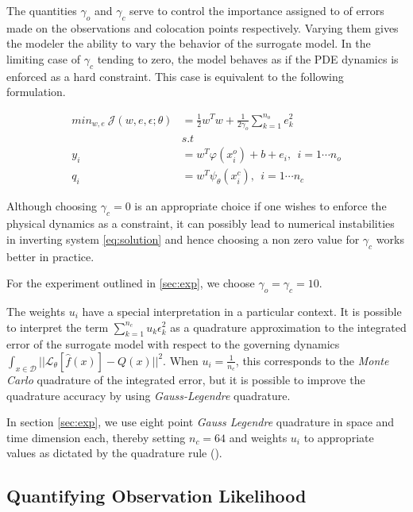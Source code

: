 The quantities $\gamma_o$ and $\gamma_c$ serve to control the importance assigned to
of errors made on the observations and colocation points respectively. Varying them 
gives the modeler the ability to vary the behavior of the surrogate model. In the 
limiting case of $\gamma_c$ tending to zero, the model behaves as if the PDE dynamics
is enforced as a hard constraint. This case is equivalent to the following formulation.

\begin{align}\label{eq:surrogate2}
   min_{w,e} \ \mathcal{J}(w,e,\epsilon;\theta) &= 
   \frac{1}{2} w^{T}w + \frac{1}{2\gamma_{o}} \sum_{k = 1}^{n_{o}}{e^{2}_{k}} \\
  & s.t \nonumber \\
  y_{i} & = w^{T}\varphi(x^{o}_{i}) + b + e_{i}, \ \ i = 1 \cdots n_{o} \\
  q_{i} & = w^{T}\psi_{\theta}(x^{c}_{i}), \ \ i = 1 \cdots n_{c}
\end{align}

Although choosing $\gamma_c = 0$ is an appropriate choice if one wishes
to enforce the physical dynamics as a constraint, it can possibly lead to numerical
instabilities in inverting system \ref{eq:solution} and hence choosing a non zero value 
for $\gamma_c$ works better in practice.

For the experiment outlined in \ref{sec:exp}, we choose $\gamma_o = \gamma_c = 10$.

The weights $u_i$ have a special interpretation in a particular context. It is possible to
interpret the term $\sum_{k = 1}^{n_{c}}{u_{k} \epsilon^{2}_{k}}$ as a quadrature approximation
to the integrated error of the surrogate model with respect to the governing dynamics $\int_{x \in \mathcal{D}}{||\mathcal{L}_{\theta} [\hat{f}(x)] - Q(x)||^2}$. When
$u_i = \frac{1}{n_c}$, this corresponds to the \emph{Monte Carlo} quadrature of 
the integrated error, but it is possible to improve the quadrature accuracy by using \emph{Gauss-Legendre} quadrature.

In section \ref{sec:exp}, we use eight point \emph{Gauss Legendre} quadrature in space and time dimension each, thereby setting $n_c = 64$ and weights $u_i$ to appropriate values as dictated by the quadrature rule (\citet{_abramowitzm}).

\subsection{Quantifying Observation Likelihood}

